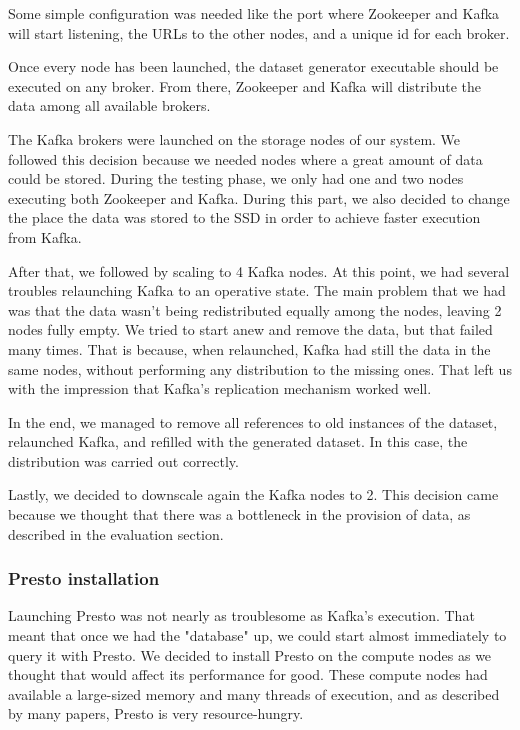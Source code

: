 \documentclass[conference]{IEEEtran}
\begin{document}
Some simple configuration was needed like the port where Zookeeper and Kafka will start listening, the URLs to the other nodes, and a unique id for each broker.

Once every node has been launched, the dataset generator executable should be executed on any broker. From there, Zookeeper and Kafka will distribute the data among all available brokers.

The Kafka brokers were launched on the storage nodes of our system. We followed this decision because we needed nodes where a great amount of data could be stored. During the testing phase, we only had one and two nodes executing both Zookeeper and Kafka. During this part, we also decided to change the place the data was stored to the SSD in order to achieve faster execution from Kafka.

After that, we followed by scaling to 4 Kafka nodes. At this point, we had several troubles relaunching Kafka to an operative state. The main problem that we had was that the data wasn't being redistributed equally among the nodes, leaving 2 nodes fully empty. We tried to start anew and remove the data, but that failed many times. That is because, when relaunched, Kafka had still the data in the same nodes, without performing any distribution to the missing ones. That left us with the impression that Kafka's replication mechanism worked well.

In the end, we managed to remove all references to old instances of the dataset, relaunched Kafka, and refilled with the generated dataset. In this case, the distribution was carried out correctly.

Lastly, we decided to downscale again the Kafka nodes to 2. This decision came because we thought that there was a bottleneck in the provision of data, as described in the evaluation section.

\subsubsection{Presto installation}
Launching Presto was not nearly as troublesome as Kafka's execution. That meant that once we had the "database" up, we could start almost immediately to query it with Presto.
We decided to install Presto on the compute nodes as we thought that would affect its performance for good. These compute nodes had available a large-sized memory and many threads of execution, and as described by many papers, Presto is very resource-hungry. \cite{sethi-2019} \cite{facebook-presto-no-date}
\end{document}
